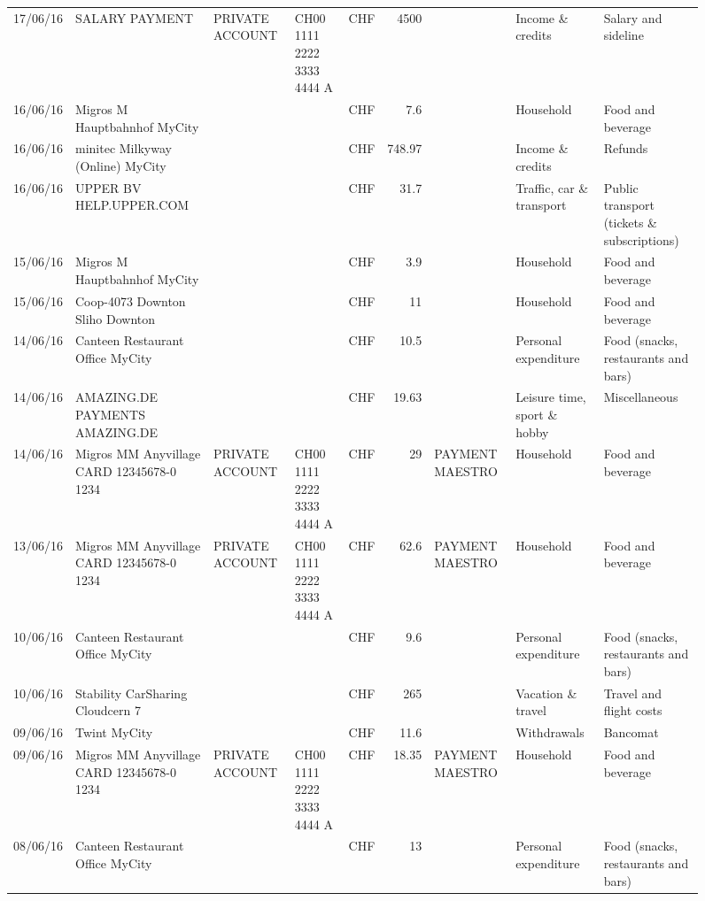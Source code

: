 \begin{landscape}
\begin{sidewaysfigure}
\begin{table}[h]
\begin{center}
\begin{tabular}{rllllrlll}
		17/06/16 & SALARY PAYMENT & PRIVATE ACCOUNT & CH00 1111 2222 3333 4444 A & CHF   & 4500  &       & Income \& credits & Salary and sideline \\
		16/06/16 & Migros M Hauptbahnhof    MyCity &       &       & CHF   & 7.6   &       & Household & Food and beverage \\
		16/06/16 & minitec Milkyway (Online) MyCity &       &       & CHF   & 748.97 &       & Income \& credits & Refunds \\
		16/06/16 & UPPER BV                  HELP.UPPER.COM &       &       & CHF   & 31.7  &       & Traffic, car \& transport & Public transport (tickets \& subscriptions) \\
		15/06/16 & Migros M Hauptbahnhof    MyCity &       &       & CHF   & 3.9   &       & Household & Food and beverage \\
		15/06/16 & Coop-4073 Downton Sliho   Downton &       &       & CHF   & 11    &       & Household & Food and beverage \\
		14/06/16 & Canteen Restaurant Office      MyCity &       &       & CHF   & 10.5  &       & Personal expenditure & Food (snacks, restaurants and bars) \\
		14/06/16 & AMAZING.DE PAYMENTS       AMAZING.DE &       &       & CHF   & 19.63 &       & Leisure time, sport \& hobby & Miscellaneous \\
		14/06/16 & Migros MM Anyvillage CARD 12345678-0 1234 & PRIVATE ACCOUNT & CH00 1111 2222 3333 4444 A & CHF   & 29    & PAYMENT MAESTRO & Household & Food and beverage \\
		13/06/16 & Migros MM Anyvillage CARD 12345678-0 1234 & PRIVATE ACCOUNT & CH00 1111 2222 3333 4444 A & CHF   & 62.6  & PAYMENT MAESTRO & Household & Food and beverage \\
		10/06/16 & Canteen Restaurant Office      MyCity &       &       & CHF   & 9.6   &       & Personal expenditure & Food (snacks, restaurants and bars) \\
		10/06/16 & Stability CarSharing      Cloudcern 7 &       &       & CHF   & 265   &       & Vacation \& travel & Travel and flight costs \\
		09/06/16 & Twint               MyCity &       &       & CHF   & 11.6  &       & Withdrawals & Bancomat \\
		09/06/16 & Migros MM Anyvillage CARD 12345678-0 1234 & PRIVATE ACCOUNT & CH00 1111 2222 3333 4444 A & CHF   & 18.35 & PAYMENT MAESTRO & Household & Food and beverage \\
		08/06/16 & Canteen Restaurant Office      MyCity &       &       & CHF   & 13    &       & Personal expenditure & Food (snacks, restaurants and bars) \\

\end{tabular}
\end{center}
\end{table}
\end{sidewaysfigure}
\end{landscape}
